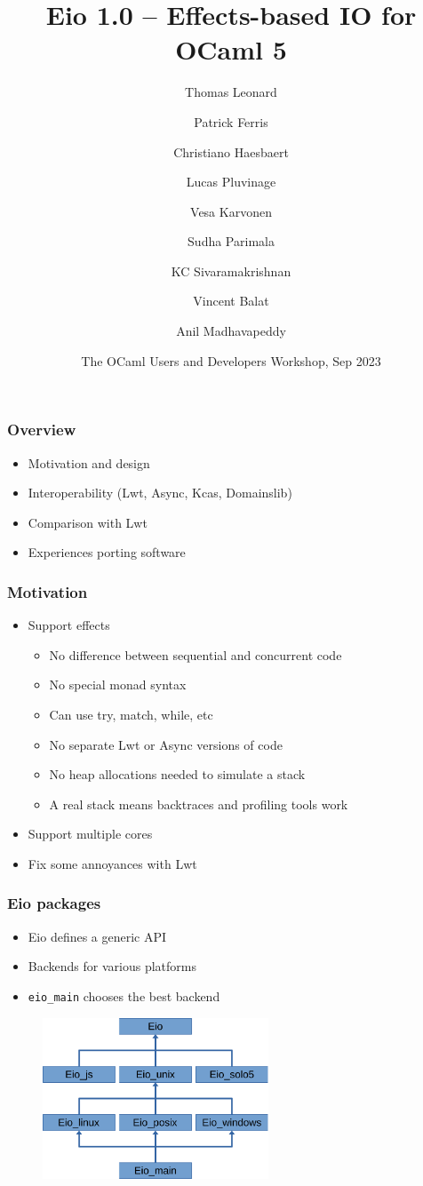 \documentclass{beamer}
\title[Eio]{Eio 1.0 – Effects-based IO for OCaml 5}
\author[Thomas Leonard]
{Thomas Leonard\and Patrick Ferris\and Christiano Haesbaert\and Lucas Pluvinage\and Vesa Karvonen\and Sudha Parimala\and KC Sivaramakrishnan\and Vincent Balat\and Anil Madhavapeddy}
\institute{Tarides}
\date[OCaml 2023]{The OCaml Users and Developers Workshop, Sep 2023}
\newcommand\mlkeyword[1]{{\ttfamily\color{darkblue} #1}}
\begin{document}

\frame{\titlepage}

\begin{frame}
	\frametitle{Overview}
	\begin{itemize}
		\item Motivation and design
		\item Interoperability (Lwt, Async, Kcas, Domainslib)
		\item Comparison with Lwt
		\item Experiences porting software
	\end{itemize}
\end{frame}

\begin{frame}[fragile]
	\frametitle{Motivation}
	\begin{itemize}
		\item Support effects
		\begin{itemize}
			\item No difference between sequential and concurrent code
			\item No special monad syntax
			\item Can use \mlkeyword{try}, \mlkeyword{match}, \mlkeyword{while}, etc
			\item No separate Lwt or Async versions of code
			\item No heap allocations needed to simulate a stack
			\item A real stack means backtraces and profiling tools work
		\end{itemize}
		\item Support multiple cores
		\item Fix some annoyances with Lwt
	\end{itemize}
\end{frame}

\begin{frame}[fragile]
	\frametitle{Eio packages}
	\begin{itemize}
		\item Eio defines a generic API
		\item Backends for various platforms
		\item \verb|eio_main| chooses the best backend
	\end{itemize}
	\begin{figure}
	\includegraphics[width=0.6\textwidth]{arch.pdf}
	\end{figure}
\end{frame}
\end{document}
